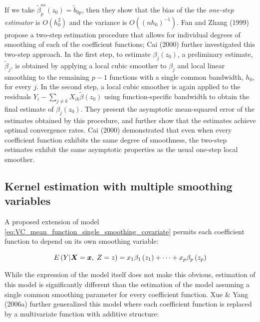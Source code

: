 \documentclass[12pt]{article}
\newcommand{\bfx}{\mbox{\boldmath $x$}}
\newcommand{\bfX}{\mbox{\boldmath $X$}}
\begin{document}
{If we take $\tilde{\beta}^{os}_p\left(z_0\right) = \tilde{b}_{0p}$, then they show that the bias of the the \textit{one-step estimator} is $O\left(h_0^2\right)$ and the variance is $O\left( \left(nh_0 \right)^{-1} \right)$. Fan and Zhang (1999) propose a two-step estimation procedure that allows for individual degrees of smoothing of each of the coefficient functions; Cai (2000) further investigated this two-step approach. In the first step, to estimate $\beta_j\left(z_0\right)$, a preliminary estimate, $\tilde{\beta}_j$, is obtained by applying a local cubic smoother to $\beta_j$ and local linear smoothing to the remaining $p-1$ functions with a single common bandwidth, $h_0$, for every $j$. In the second step, a local cubic smoother is again applied to the residuals $Y_i-\sum_{j\ne k} X_{ik} \tilde{\beta}\left( z_0 \right)$ using function-specific bandwidth to obtain the final estimate of $\beta_j\left(z_0\right)$. They present the asymptotic mean-squared error of the estimates obtained by this procedure, and further show  that the estimates achieve optimal convergence rates. Cai (2000) demonstrated that even when every coefficient function exhibits the same degree of smoothness, the two-step estimates exhibit the same asymptotic properties as the usual one-step local smoother.  

\subsection{Kernel estimation with multiple smoothing variables}

A proposed extension of model \ref{eq:VC_mean_function_single_smoothing_covariate} permits each coefficient function to depend on its own smoothing variable: 

\begin{equation} \nonumber
E\left(Y \vert \bfX=\bfx,\;Z = z \right) = x_1\beta_1\left(z_1\right) + \dots  + x_p\beta_p\left(z_p\right)
\end{equation}

While the expression of the model itself does not make this obvious, estimation of this model is significantly different than the estimation of the model assuming a single common smoothing parameter for every coefficient function. Xue \& Yang (2006a) further generalized this model where each coefficient function is replaced by a multivariate function with additive structure:

}
\end{document}
